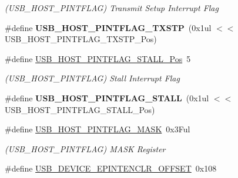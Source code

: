 \begin{DoxyCompactItemize}
\begin{DoxyCompactList}\small\item\em (U\+S\+B\+\_\+\+H\+O\+S\+T\+\_\+\+P\+I\+N\+T\+F\+L\+A\+G) Transmit Setup Interrupt Flag \end{DoxyCompactList}\item 
\hypertarget{group___s_a_m_l21___u_s_b_ga7c52dabedc9a19c853549bb7a4e1081a}{}\#define {\bfseries U\+S\+B\+\_\+\+H\+O\+S\+T\+\_\+\+P\+I\+N\+T\+F\+L\+A\+G\+\_\+\+T\+X\+S\+T\+P}~(0x1ul $<$$<$ U\+S\+B\+\_\+\+H\+O\+S\+T\+\_\+\+P\+I\+N\+T\+F\+L\+A\+G\+\_\+\+T\+X\+S\+T\+P\+\_\+\+Pos)\label{group___s_a_m_l21___u_s_b_ga7c52dabedc9a19c853549bb7a4e1081a}

\item 
\hypertarget{group___s_a_m_l21___u_s_b_gaf04e6f5f6a282c7075514927b8b08e79}{}\#define \hyperlink{group___s_a_m_l21___u_s_b_gaf04e6f5f6a282c7075514927b8b08e79}{U\+S\+B\+\_\+\+H\+O\+S\+T\+\_\+\+P\+I\+N\+T\+F\+L\+A\+G\+\_\+\+S\+T\+A\+L\+L\+\_\+\+Pos}~5\label{group___s_a_m_l21___u_s_b_gaf04e6f5f6a282c7075514927b8b08e79}

\begin{DoxyCompactList}\small\item\em (U\+S\+B\+\_\+\+H\+O\+S\+T\+\_\+\+P\+I\+N\+T\+F\+L\+A\+G) Stall Interrupt Flag \end{DoxyCompactList}\item 
\hypertarget{group___s_a_m_l21___u_s_b_ga5e2acf2668af7431980dbd948659f578}{}\#define {\bfseries U\+S\+B\+\_\+\+H\+O\+S\+T\+\_\+\+P\+I\+N\+T\+F\+L\+A\+G\+\_\+\+S\+T\+A\+L\+L}~(0x1ul $<$$<$ U\+S\+B\+\_\+\+H\+O\+S\+T\+\_\+\+P\+I\+N\+T\+F\+L\+A\+G\+\_\+\+S\+T\+A\+L\+L\+\_\+\+Pos)\label{group___s_a_m_l21___u_s_b_ga5e2acf2668af7431980dbd948659f578}

\item 
\hypertarget{group___s_a_m_l21___u_s_b_gacc92030d03adc5cf54487929e7d16f31}{}\#define \hyperlink{group___s_a_m_l21___u_s_b_gacc92030d03adc5cf54487929e7d16f31}{U\+S\+B\+\_\+\+H\+O\+S\+T\+\_\+\+P\+I\+N\+T\+F\+L\+A\+G\+\_\+\+M\+A\+S\+K}~0x3\+Ful\label{group___s_a_m_l21___u_s_b_gacc92030d03adc5cf54487929e7d16f31}

\begin{DoxyCompactList}\small\item\em (U\+S\+B\+\_\+\+H\+O\+S\+T\+\_\+\+P\+I\+N\+T\+F\+L\+A\+G) M\+A\+S\+K Register \end{DoxyCompactList}\item 
\hypertarget{group___s_a_m_l21___u_s_b_ga1ee17531a6ece45480070fa0250ea40e}{}\#define \hyperlink{group___s_a_m_l21___u_s_b_ga1ee17531a6ece45480070fa0250ea40e}{U\+S\+B\+\_\+\+D\+E\+V\+I\+C\+E\+\_\+\+E\+P\+I\+N\+T\+E\+N\+C\+L\+R\+\_\+\+O\+F\+F\+S\+E\+T}~0x108\label{group___s_a_m_l21___u_s_b_ga1ee17531a6ece45480070fa0250ea40e}


\end{DoxyCompactItemize}
